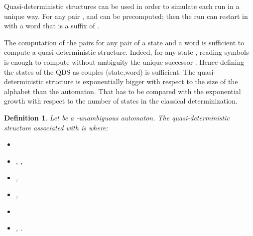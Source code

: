 \documentclass[11pt]{elsarticle}
\newtheorem{definition}{Definition}
\newcommand\modif[2]{{#2}}
\begin{document}
Quasi-deterministic structures can be used in order to simulate each run in a unique way. For any pair ,   and  can be precomputed; then the run can restart in  with a word  that is a suffix of . 






  The computation of the pairs  for any pair  of a state and a word is sufficient to compute a quasi-deterministic structure. 
  \modif{}{Indeed, for any state , reading  symbols  is enough to compute without ambiguity the unique successor . Hence defining the states of the QDS as couples (state,word) is sufficient.}
  The quasi-deterministic structure is exponentially bigger with respect to the size of the alphabet than the automaton. That has to be compared with the exponential growth with respect to the number of states in the classical determinization.

\begin{definition}\label{def qds}
  Let  be a -unambiguous automaton. The \emph{quasi-deterministic structure associated with}  is    where:
  \begin{itemize}
  \item 
    \item , ,
    \item ,
    \item ,
    \item 




    \item , .
  \end{itemize}
\end{definition}
\end{document}

